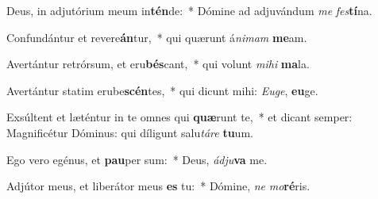 \item Deus, in adjutórium meum in\textbf{tén}de:~* Dómine ad adjuvándum \textit{me} \textit{fes}\textbf{tí}na.
\item Confundántur et revere\textbf{án}\-tur,~* qui quærunt á\textit{ni}\textit{mam} \textbf{me}am.
\item Avertántur retrórsum, et eru\textbf{bés}cant,~* qui volunt \textit{mi}\textit{hi} \textbf{ma}la.
\item Avertántur statim erube\textbf{scén}\-tes,~* qui dicunt mihi: \textit{Eu}\textit{ge}, \textbf{eu}ge.
\item Exsúltent et læténtur in te omnes qui \textbf{quæ}runt te,~* et dicant semper: Magnificétur Dóminus: qui díligunt salu\textit{tá}\textit{re} \textbf{tu}um.
\item Ego vero egénus, et \textbf{pau}per sum:~* Deus, \textit{ád}\textit{ju}\textbf{va} me.
\item Adjútor meus, et liberátor meus \textbf{es} tu:~* Dómine, \textit{ne} \textit{mo}\textbf{ré}ris.
